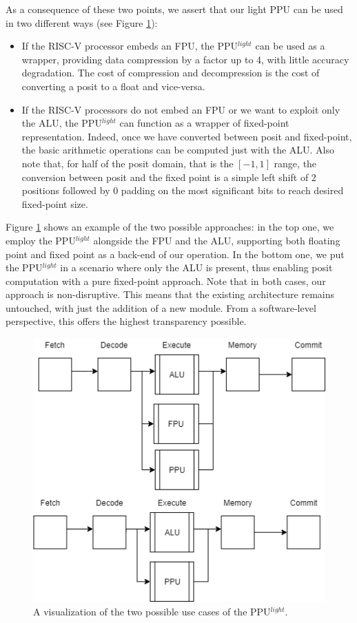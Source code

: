 As a consequence of these two points, we assert that our light PPU can be used in two different ways (see Figure \ref{fig:use_cases}):
\begin{itemize}
    \item If the RISC-V processor embeds an FPU, the PPU$^{light}$ can be used as a wrapper, providing data compression by a factor up to 4, with little accuracy degradation. The cost of compression and decompression is the cost of converting a posit to a float and vice-versa.
    \item If the RISC-V processors do not embed an FPU or we want to exploit only the ALU, the PPU$^{light}$ can function as a wrapper of fixed-point representation. Indeed, once we have converted between posit and fixed-point, the basic arithmetic operations can be computed just with the ALU. Also note that, for half of the posit domain, that is the $[-1,1]$ range, the conversion between posit and the fixed point is a simple left shift of $2$ positions followed by $0$ padding on the most significant bits to reach desired fixed-point size.
\end{itemize}

Figure \ref{fig:use_cases} shows an example of the two possible approaches: in the top one, we employ the PPU$^{light}$ alongside the  FPU  and  the  ALU,  supporting  both  floating  point  and fixed  point  as  a  back-end  of  our  operation.  In  the  bottom one, we put the  PPU$^{light}$ in a scenario where only the ALU is present, thus enabling posit computation with a pure fixed-point approach. Note that in both cases, our approach is non-disruptive. This means that the existing architecture remains untouched, with just the addition of a new module. From a software-level perspective, this offers the highest transparency possible.


\begin{figure}
    \centering
    \includegraphics[width=0.5\linewidth]{img/use_cases.png}
    \caption{A visualization of the two possible use cases of the PPU$^{light}$. }
    \label{fig:use_cases}
\end{figure}


